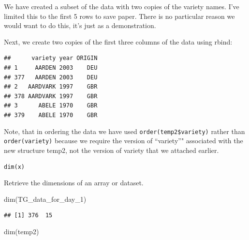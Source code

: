 \documentclass[
]{book}
\newenvironment{Shaded}{\begin{snugshade}}{\end{snugshade}}
\newcommand{\DecValTok}[1]{\textcolor[rgb]{0.00,0.00,0.81}{#1}}
\newcommand{\FunctionTok}[1]{\textcolor[rgb]{0.00,0.00,0.00}{#1}}
\newcommand{\NormalTok}[1]{#1}
\newcommand{\OtherTok}[1]{\textcolor[rgb]{0.56,0.35,0.01}{#1}}
\newcommand{\SpecialCharTok}[1]{\textcolor[rgb]{0.00,0.00,0.00}{#1}}
\begin{document}
We have created a subset of the data with two copies of the variety names. I've limited this to the first 5 rows to save paper. There is no particular reason we would want to do this, it's just as a demonstration.

Next, we create two copies of the first three columns of the data using rbind:

\begin{Shaded}
\end{Shaded}

\begin{verbatim}
##      variety year ORIGIN
## 1     AARDEN 2003    DEU
## 377   AARDEN 2003    DEU
## 2   AARDVARK 1997    GBR
## 378 AARDVARK 1997    GBR
## 3      ABELE 1970    GBR
## 379    ABELE 1970    GBR
\end{verbatim}

Note, that in ordering the data we have used \texttt{order(temp2\$variety)} rather than \texttt{order(variety)} because we require the version of ``variety''" associated with the new structure temp2, not the version of variety that we attached earlier.

\texttt{dim(x)}

Retrieve the dimensions of an array or dataset.

\begin{Shaded}
\begin{Highlighting}[]
\FunctionTok{dim}\NormalTok{(TG\_data\_for\_day\_1)}
\end{Highlighting}
\end{Shaded}

\begin{verbatim}
## [1] 376  15
\end{verbatim}

\begin{Shaded}
\begin{Highlighting}[]
\FunctionTok{dim}\NormalTok{(temp2)}
\end{Highlighting}
\end{Shaded}
\end{document}
